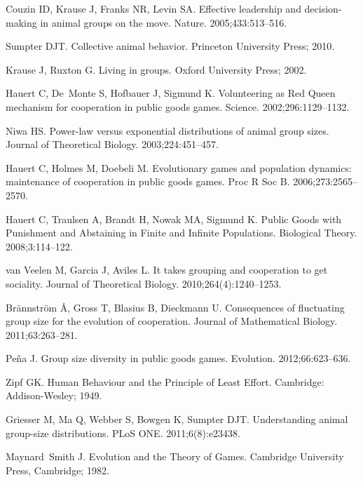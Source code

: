 \documentclass[aps,pre,amsfonts,floatfix, onecolumn,showkeys]{revtex4-1}
\begin{document}
\begin{thebibliography}{10}
Couzin ID, Krause J, Franks NR, Levin SA.
\newblock Effective leadership and decision-making in animal groups on the
  move.
\newblock Nature. 2005;433:513--516.

Sumpter DJT.
\newblock Collective animal behavior.
\newblock Princeton University Press; 2010.

Krause J, Ruxton G.
\newblock Living in groups.
\newblock Oxford University Press; 2002.

Hauert C, De~Monte S, Hofbauer J, Sigmund K.
\newblock Volunteering as Red Queen mechanism for cooperation in public goods
  games.
\newblock Science. 2002;296:1129--1132.

Niwa HS.
\newblock Power-law versus exponential distributions of animal group sizes.
\newblock Journal of Theoretical Biology. 2003;224:451--457.

Hauert C, Holmes M, Doebeli M.
\newblock Evolutionary games and population dynamics: maintenance of
  cooperation in public goods games.
\newblock Proc R Soc B. 2006;273:2565--2570.

Hauert C, Traulsen A, Brandt H, Nowak MA, Sigmund K.
\newblock Public Goods with Punishment and Abstaining in Finite and Infinite
  Populations.
\newblock Biological Theory. 2008;3:114--122.

van Veelen M, Garcia J, Aviles L.
\newblock It takes grouping and cooperation to get sociality.
\newblock Journal of Theoretical Biology. 2010;264(4):1240--1253.

Br{\"a}nnstr{\"o}m {\AA}, Gross T, Blasius B, Dieckmann U.
\newblock Consequences of fluctuating group size for the evolution of
  cooperation.
\newblock Journal of Mathematical Biology. 2011;63:263--281.

Pe{\~n}a J.
\newblock Group size diversity in public goods games.
\newblock Evolution. 2012;66:623--636.

Zipf GK.
\newblock Human Behaviour and the Principle of Least Effort.
\newblock Cambridge: Addison-Wesley; 1949.

Griesser M, Ma Q, Webber S, Bowgen K, Sumpter DJT.
\newblock Understanding animal group-size distributions.
\newblock PLoS ONE. 2011;6(8):e23438.

Maynard~Smith J.
\newblock Evolution and the Theory of Games.
\newblock Cambridge University Press, Cambridge; 1982.


\end{thebibliography}
\end{document}
